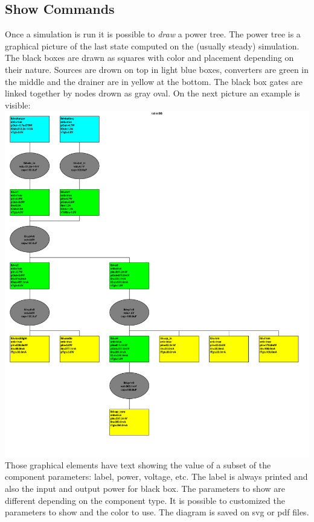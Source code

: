 \documentclass[12pt,a4paper]{book}
\begin{document}
\subsection{Show Commands}
Once a simulation is run it is possible to \emph{draw} a power tree. The power tree is a graphical picture of the last state computed on the (usually steady) simulation. The black boxes are drawn as squares with color and placement depending on their nature. Sources are drown on top in light blue boxes, converters are green in the middle and the drainer are in yellow at the bottom. The black box gates are linked together by nodes drown as gray oval. On the next picture an example is visible:\\
\includegraphics[width=\textwidth]{tabletBB.pdf}\\
Those graphical elements have text showing the value of a subset of the component parameters: label, power, voltage, etc. The label is always printed and also the input and output power for black box. The parameters to show are different depending on the component type. It is possible to customized the parameters to show and the color to use. The diagram is saved on svg or pdf files.\\
\end{document}
